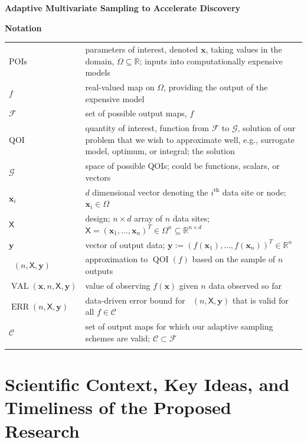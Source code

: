 \documentclass[11pt]{NSFamsart}
\DeclareMathOperator{\QOI}{QOI}
\DeclareMathOperator{\APP}{\widehat{\QOI}}
\DeclareMathOperator{\ERR}{ERR}
\DeclareMathOperator{\VAL}{VAL}
\newcommand{\reals}{{\mathbb{R}}}
\newcommand{\mX}{\mathsf{X}}
\newcommand{\bx}{{\boldsymbol{x}}}
\newcommand{\by}{{\boldsymbol{y}}}
\newcommand{\calc}{{\mathcal{C}}}
\newcommand{\calf}{{\mathcal{F}}}
\newcommand{\calg}{{\mathcal{G}}}
\begin{document}

\begin{center}
\Large \textbf{
Adaptive Multivariate Sampling to Accelerate  Discovery\\ 
}
\end{center}
\vspace{-2ex}

\setcounter{tocdepth}{4}
\tableofcontents

\vspace{-6ex}

\noindent \textbf{Notation}

\begin{longtable}{>{\raggedleft}p{2.5cm}@{\quad}>{\raggedright}p{12.5cm}}
POIs & parameters of interest, denoted $\bx$, taking values in the domain, $\Omega \subseteq \reals$; inputs into computationally expensive models \tabularnewline
$f$ & real-valued map on $\Omega$, providing the output of the expensive model \tabularnewline
$\calf$ & set of possible output maps, $f$ \tabularnewline
QOI & quantity of interest, function from $\calf$ to $\calg$, solution of our problem that we wish to approximate well, e.g., surrogate model, optimum, or integral; the solution \tabularnewline
$\calg$ & space of possible QOIs; could be functions, scalars, or vectors\tabularnewline
$\bx_i$ & $d$ dimensional vector denoting the $i^{\text{th}}$ data site or node; $\bx_i \in \Omega$ \tabularnewline
$\mX$ & design;  $n \times d$ array of $n$ data sites; $\mX = (\bx_1, \ldots, \bx_n)^T \in \Omega^{n} \subseteq \reals^{n \times d}$ \tabularnewline
$\by$ & vector of output data; $\by := (f(\bx_1), \ldots, f(\bx_n))^T \in \reals^n$   \tabularnewline
$\APP(n,\mX,\by)$ & approximation to $\QOI(f)$ based on the sample of $n$ outputs\tabularnewline
$\VAL(\bx,n,\mX, \by)$ & value of observing $f(\bx)$ given $n$ data observed so far \tabularnewline
$\ERR(n,\mX,\by)$ & data-driven error bound for $\APP(n,\mX,\by)$ that is valid for all $f \in \calc$ \tabularnewline
$\calc$ & set of output maps for which our adaptive sampling schemes are valid; $\calc \subset \calf$ \tabularnewline
& \tabularnewline
\end{longtable}

\section{Scientific Context, Key Ideas, and Timeliness of the Proposed Research}
\end{document}
